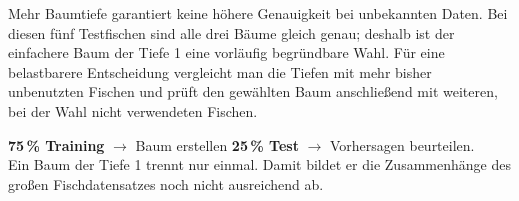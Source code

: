 \documentclass[11pt,a4paper]{article}
\newcommand{\fach}[1]{\textbf{\color{navy}#1}}
\begin{document}
\begin{merke}
Mehr Baumtiefe garantiert keine höhere Genauigkeit bei unbekannten Daten. Bei diesen fünf Testfischen sind alle drei
Bäume gleich genau; deshalb ist der einfachere Baum der Tiefe 1 eine vorläufig begründbare Wahl. Für eine
belastbarere Entscheidung vergleicht man die Tiefen mit mehr bisher unbenutzten Fischen und prüft den gewählten Baum
anschließend mit weiteren, bei der Wahl nicht verwendeten Fischen.
\end{merke}

\begin{beispiel}[title=Vertiefung 4a: großer Datensatz]
\fach{75\,\% Training} $\longrightarrow$ Baum erstellen \qquad
\fach{25\,\% Test} $\longrightarrow$ Vorhersagen beurteilen.\\
Ein Baum der Tiefe 1 trennt nur einmal. Damit bildet er die Zusammenhänge des großen Fischdatensatzes
noch nicht ausreichend ab.
\end{beispiel}
\end{document}
